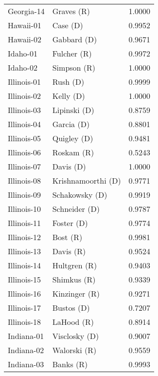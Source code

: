 \begin{longtable}{llr}
        Georgia-14 &           Graves (R) &       1.0000 \\
         Hawaii-01 &             Case (D) &       0.9952 \\
         Hawaii-02 &          Gabbard (D) &       0.9671 \\
          Idaho-01 &          Fulcher (R) &       0.9972 \\
          Idaho-02 &          Simpson (R) &       1.0000 \\
       Illinois-01 &             Rush (D) &       0.9999 \\
       Illinois-02 &            Kelly (D) &       1.0000 \\
       Illinois-03 &         Lipinski (D) &       0.8759 \\
       Illinois-04 &           Garcia (D) &       0.8801 \\
       Illinois-05 &          Quigley (D) &       0.9481 \\
       Illinois-06 &           Roskam (R) &       0.5243 \\
       Illinois-07 &            Davis (D) &       1.0000 \\
       Illinois-08 &   Krishnamoorthi (D) &       0.9771 \\
       Illinois-09 &       Schakowsky (D) &       0.9919 \\
       Illinois-10 &        Schneider (D) &       0.9787 \\
       Illinois-11 &           Foster (D) &       0.9774 \\
       Illinois-12 &             Bost (R) &       0.9981 \\
       Illinois-13 &            Davis (R) &       0.9524 \\
       Illinois-14 &         Hultgren (R) &       0.9403 \\
       Illinois-15 &          Shimkus (R) &       0.9339 \\
       Illinois-16 &        Kinzinger (R) &       0.9271 \\
       Illinois-17 &           Bustos (D) &       0.7207 \\
       Illinois-18 &           LaHood (R) &       0.8914 \\
        Indiana-01 &        Visclosky (D) &       0.9007 \\
        Indiana-02 &         Walorski (R) &       0.9559 \\
        Indiana-03 &            Banks (R) &       0.9993 \\

\end{longtable}
